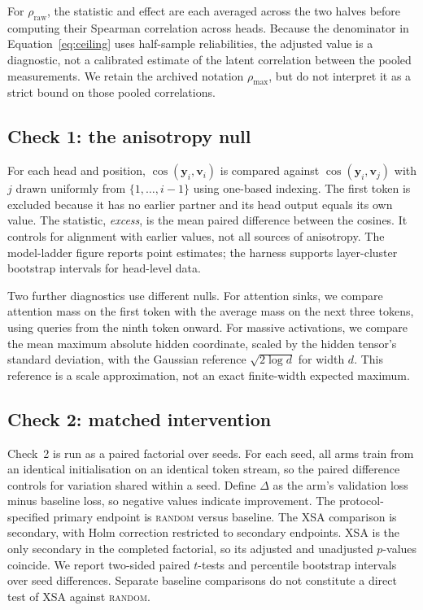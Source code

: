 \documentclass{article} %
\newcommand{\yv}{\mathbf{y}}
\begin{document}
For $\rho_{\text{raw}}$, the statistic and effect are each averaged across
the two halves before computing their Spearman correlation across heads.
Because the denominator in Equation~\ref{eq:ceiling} uses half-sample
reliabilities, the adjusted value is a diagnostic, not a calibrated estimate
of the latent correlation between the pooled measurements. We retain the
archived notation $\rho_{\max}$, but do not interpret it as a strict bound
on those pooled correlations.

\subsection{Check 1: the anisotropy null}

For each head and position, $\cos(\yv_i, \mathbf{v}_i)$ is compared against
$\cos(\yv_i, \mathbf{v}_j)$ with $j$ drawn uniformly from
$\{1,\dots,i-1\}$ using one-based indexing. The first token is excluded
because it has no earlier partner and its head output equals its own value.
The statistic, \emph{excess}, is the mean paired difference between the
cosines. It controls for alignment with earlier values, not all sources of
anisotropy. The model-ladder figure reports point estimates; the harness
supports layer-cluster bootstrap intervals for head-level data.

\begin{samepage}
Two further diagnostics use different nulls. For attention sinks, we compare
attention mass on the first token with the average mass on the next three
tokens, using queries from the ninth token onward. For massive activations,
we compare the mean maximum absolute hidden coordinate, scaled by the hidden
tensor's standard deviation, with the Gaussian reference
$\sqrt{2\log d}$ for width $d$. This reference is a scale approximation,
not an exact finite-width expected maximum.
\end{samepage}

\subsection{Check 2: matched intervention}
\label{sec:check2}

Check~2 is run as a paired factorial over seeds. For each seed, all arms train
from an identical initialisation on an identical token stream, so the paired
difference controls for variation shared within a seed. Define $\Delta$ as
the arm's validation loss minus baseline loss, so negative values indicate
improvement. The protocol-specified primary endpoint is \textsc{random}
versus baseline. The XSA comparison is secondary, with Holm correction
\citep{holm1979simple} restricted to secondary endpoints. XSA is the only
secondary in the completed factorial, so its adjusted and unadjusted
$p$-values coincide. We report two-sided paired $t$-tests and percentile
bootstrap intervals over seed differences. Separate baseline comparisons
do not constitute a direct test of XSA against \textsc{random}.
\end{document}
